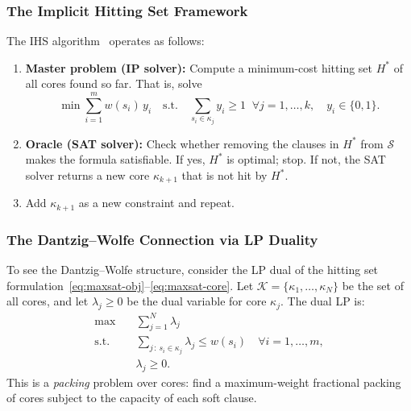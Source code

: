 \subsubsection{The Implicit Hitting Set Framework}

The IHS algorithm~\citep{davies2011solving,moreno2013implicit} operates as follows:
\begin{enumerate}
\item \textbf{Master problem (IP solver):} Compute a minimum-cost hitting set $H^*$ of all cores found so far. That is, solve
\[
\min \sum_{i=1}^{m} w(s_i)\, y_i \quad \text{s.t.} \quad \sum_{s_i \in \kappa_j} y_i \geq 1 \;\; \forall j = 1,\ldots,k, \quad y_i \in \{0,1\}.
\]
\item \textbf{Oracle (SAT solver):} Check whether removing the clauses in $H^*$ from $\mathcal{S}$ makes the formula satisfiable. If yes, $H^*$ is optimal; stop. If not, the SAT solver returns a new core $\kappa_{k+1}$ that is not hit by $H^*$.
\item Add $\kappa_{k+1}$ as a new constraint and repeat.
\end{enumerate}

\subsubsection{The Dantzig--Wolfe Connection via LP Duality}

To see the Dantzig--Wolfe structure, consider the LP dual of the hitting set
formulation~\eqref{eq:maxsat-obj}--\eqref{eq:maxsat-core}. Let $\mathcal{K} =
\{\kappa_1, \ldots, \kappa_N\}$ be the set of all cores, and let $\lambda_j
\geq 0$ be the dual variable for core $\kappa_j$. The dual LP is:
\begin{align}
\max \quad & \sum_{j=1}^{N} \lambda_j \label{eq:dual-obj}\\
\text{s.t.} \quad & \sum_{j \,:\, s_i \in \kappa_j} \lambda_j \leq w(s_i) \quad \forall i = 1,\ldots,m, \label{eq:dual-pack}\\
& \lambda_j \geq 0. \label{eq:dual-nn}
\end{align}
This is a \emph{packing} problem over cores: find a maximum-weight fractional
packing of cores subject to the capacity of each soft clause.

